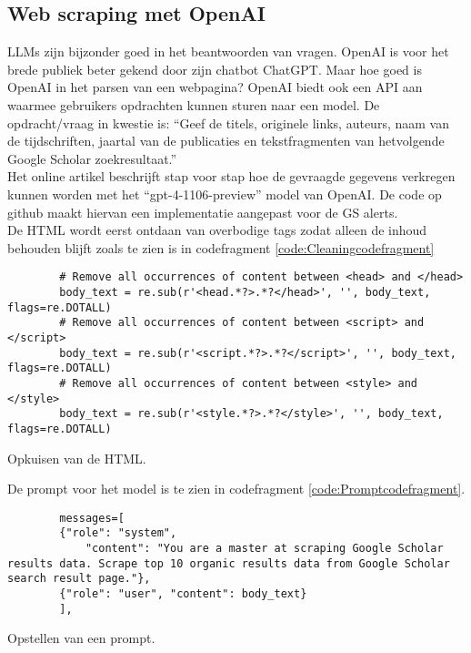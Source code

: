 \subsection{Web scraping met OpenAI}
LLMs zijn bijzonder goed in het beantwoorden van vragen. OpenAI is voor het brede publiek beter gekend door zijn chatbot ChatGPT. Maar hoe goed is OpenAI in het parsen van een webpagina? OpenAI biedt ook een API \autocite{Openaideveloperplatform2025} aan waarmee gebruikers opdrachten kunnen sturen naar een model. De opdracht/vraag in kwestie is: ``Geef de titels, originele links, auteurs, naam van de tijdschriften, jaartal van de publicaties en tekstfragmenten van hetvolgende Google Scholar zoekresultaat.''\\
Het online artikel \textcite{Serpapiai2025} beschrijft stap voor stap hoe de gevraagde gegevens verkregen kunnen worden met het ``gpt-4-1106-preview'' model van OpenAI.
De code op github \textcite{Depaepeopenai2025} maakt hiervan een implementatie aangepast voor de GS alerts.\\
De HTML wordt eerst ontdaan van overbodige tags zodat alleen de inhoud behouden blijft zoals te zien is in codefragment \ref{code:Cleaningcodefragment}
\begin{listing}[h!]
    \begin{verbatim}
        # Remove all occurrences of content between <head> and </head>
        body_text = re.sub(r'<head.*?>.*?</head>', '', body_text, flags=re.DOTALL)
        # Remove all occurrences of content between <script> and </script>
        body_text = re.sub(r'<script.*?>.*?</script>', '', body_text, flags=re.DOTALL)
        # Remove all occurrences of content between <style> and </style>
        body_text = re.sub(r'<style.*?>.*?</style>', '', body_text, flags=re.DOTALL)
    \end{verbatim}
    \caption[HTML cleaning]{Opkuisen van de HTML.}
    \label{code:Cleaningcodefragment}
\end{listing}
De prompt voor het model is te zien in codefragment \ref{code:Promptcodefragment}.
\begin{listing}[h!]
    \begin{verbatim}
        messages=[
        {"role": "system",
            "content": "You are a master at scraping Google Scholar results data. Scrape top 10 organic results data from Google Scholar search result page."},
        {"role": "user", "content": body_text}
        ],
    \end{verbatim}
    \caption[OpenAI prompt]{Opstellen van een prompt.}
    \label{code:Promptcodefragment}
\end{listing}
